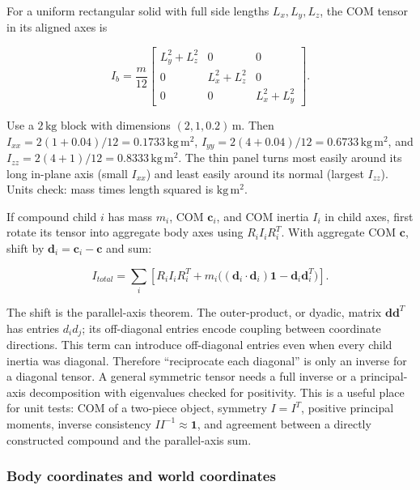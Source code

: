 For a uniform rectangular solid with full side lengths \(L_x,L_y,L_z\), the COM tensor in its aligned axes is

\[
I_b=\frac{m}{12}\begin{bmatrix}L_y^2+L_z^2&0&0\\0&L_x^2+L_z^2&0\\0&0&L_x^2+L_y^2\end{bmatrix}.
\]

Use a \(2\,\mathrm{kg}\) block with dimensions \((2,1,0.2)\,\mathrm m\). Then \(I_{xx}=2(1+0.04)/12=0.1733\,\mathrm{kg\,m^2}\), \(I_{yy}=2(4+0.04)/12=0.6733\,\mathrm{kg\,m^2}\), and \(I_{zz}=2(4+1)/12=0.8333\,\mathrm{kg\,m^2}\). The thin panel turns most easily around its long in-plane axis (small \(I_{xx}\)) and least easily around its normal (largest \(I_{zz}\)). Units check: mass times length squared is \(\mathrm{kg\,m^2}\).

If compound child \(i\) has mass \(m_i\), COM \(\mathbf c_i\), and COM inertia \(I_i\) in child axes, first rotate its tensor into aggregate body axes using \(R_iI_iR_i^T\). With aggregate COM \(\mathbf c\), shift by \(\mathbf d_i=\mathbf c_i-\mathbf c\) and sum:

\[
I_{total}=\sum_i\left[R_iI_iR_i^T+m_i\big((\mathbf d_i\cdot\mathbf d_i)\mathbf 1-\mathbf d_i\mathbf d_i^T\big)\right].
\]

The shift is the parallel-axis theorem. The outer-product, or dyadic, matrix \(\mathbf d\mathbf d^T\) has entries \(d_i d_j\); its off-diagonal entries encode coupling between coordinate directions. This term can introduce off-diagonal entries even when every child inertia was diagonal. Therefore ``reciprocate each diagonal'' is only an inverse for a diagonal tensor. A general symmetric tensor needs a full inverse or a principal-axis decomposition with eigenvalues checked for positivity. This is a useful place for unit tests: COM of a two-piece object, symmetry \(I=I^T\), positive principal moments, inverse consistency \(II^{-1}\approx\mathbf1\), and agreement between a directly constructed compound and the parallel-axis sum.

\subsubsection{Body coordinates and world coordinates}\label{06-engine-ii-ch034-body-coordinates-and-world-coordinates}

\hypertarget{06-engine-ii-ch034-body-coordinates-and-world-coordinates}{}


